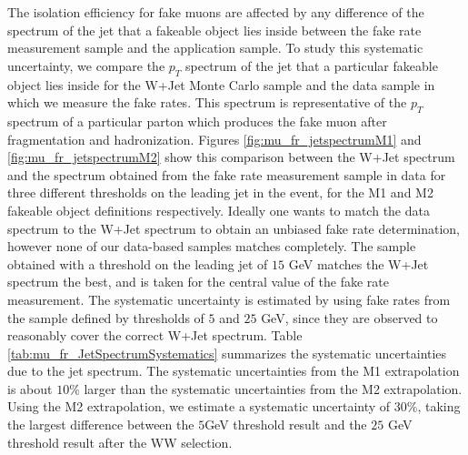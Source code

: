 The isolation efficiency for fake muons are affected by any difference of the spectrum of the
jet that a fakeable object lies inside between the fake rate measurement sample and the 
application sample. To study this systematic uncertainty, we compare the $p_{T}$ spectrum 
of the jet that a particular fakeable object lies inside for the W+Jet Monte Carlo sample and the
data sample in which we measure the fake rates. This spectrum is representative of the $p_{T}$
spectrum of a particular parton which produces the fake muon after fragmentation and 
hadronization. Figures \ref{fig:mu_fr_jetspectrumM1} and \ref{fig:mu_fr_jetspectrumM2} show 
this comparison between the W+Jet spectrum and the spectrum obtained from the fake rate measurement 
sample in data for three different thresholds on the leading jet in the event, for the M1 and M2
fakeable object definitions respectively. Ideally one wants to match the data spectrum to the
W+Jet spectrum to obtain an unbiased fake rate determination, however none of our data-based
samples matches completely. The sample obtained with a threshold on the leading jet of
$15$ GeV matches the W+Jet spectrum the best, and is taken for the central value of the 
fake rate measurement. The systematic uncertainty is estimated by using fake rates from the sample 
defined by thresholds of $5$ and $25$ GeV, since they are observed to reasonably cover the 
correct W+Jet spectrum. Table \ref{tab:mu_fr_JetSpectrumSystematics} summarizes the systematic
uncertainties due to the jet spectrum. The systematic uncertainties from the M1 extrapolation
is about $10\%$ larger than the systematic uncertainties from the M2 extrapolation. 
Using the M2 extrapolation, we estimate a systematic uncertainty of $30\%$, taking the largest 
difference between the $5$GeV threshold result and the $25$ GeV threshold result after the 
WW selection.

